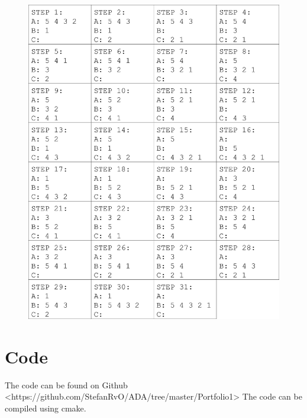 \documentclass[a4paper,12pt,danish]{article}
\begin{document}
    \begin{figure}[H]     
    	\centering
    	\includegraphics[width=\textwidth]{steps.jpg}
    	\caption{}
    	\label{steps}
    \end{figure}
    
\section{Code}
The code can be found on Github <https://github.com/StefanRvO/ADA/tree/master/Portfolio1>
The code can be compiled using cmake.
\end{document}
